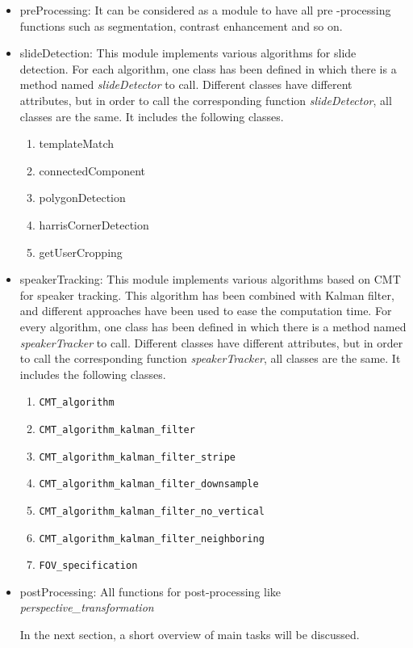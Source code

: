 \documentclass[[12pt,DIV14,BCOR12mm,a4paper,footexclude,headinclude,halfparskip-,twoside,openright,cleardoubleempty,idxtotoc,bibtotoc]{article}
\begin{document}
\begin{itemize}
\item preProcessing: It can be considered as a module to have all pre -processing functions such as segmentation, contrast enhancement and so on.

\item slideDetection: This module implements various algorithms for slide detection. For each algorithm, 
one class has been defined in which there is a method named \textit{slideDetector} to call.
Different classes have different attributes, but in order to call the corresponding function \textit{slideDetector}, all classes are the same. It includes the following classes.

\begin{enumerate}
\item templateMatch
\item connectedComponent
\item polygonDetection
\item harrisCornerDetection
\item getUserCropping
\end{enumerate}

\item speakerTracking: This module implements various algorithms based on CMT for speaker tracking. 
This algorithm has been combined with Kalman filter, and 
different approaches have been used to ease the computation time.
 For every algorithm, one class has been defined in which there is a method named \textit{speakerTracker} to call.
Different classes have different attributes, but in order to call the corresponding
function \textit{speakerTracker}, all classes are the same. It includes the following classes.

\begin{enumerate}
\item \texttt{CMT\_algorithm}
\item \texttt{CMT\_algorithm\_kalman\_filter}
\item \texttt{CMT\_algorithm\_kalman\_filter\_stripe}
\item \texttt{CMT\_algorithm\_kalman\_filter\_downsample}
\item \texttt{CMT\_algorithm\_kalman\_filter\_no\_vertical}
\item \texttt{CMT\_algorithm\_kalman\_filter\_neighboring}
\item \texttt{FOV\_specification}
\end{enumerate}

\item postProcessing: All functions for post-processing like \textit{perspective\_transformation}

In the next section, a short overview of main tasks will be discussed.

\end{itemize}
\end{document}
